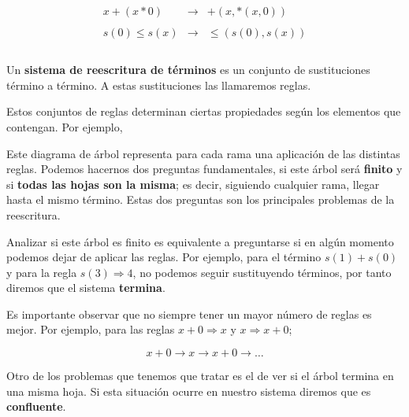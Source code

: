 \[
  \begin{array}{rcl}
    x +(x*0) & \longrightarrow  & +(x,*(x,0)) \\ \\
    s(0) \leq s(x) & \longrightarrow & \leq(s(0),s(x)) \\ \\

  \end{array} 
\]

Un \textbf{sistema de reescritura de términos} es un conjunto de sustituciones
término a término. A estas sustituciones las llamaremos reglas.

Estos conjuntos de reglas determinan ciertas propiedades según los
elementos que contengan. Por ejemplo,

\begin{figure}[h]
  \centering
\end{figure}

Este diagrama de árbol representa para cada rama una aplicación de las
distintas reglas. Podemos hacernos dos preguntas fundamentales, si
este árbol será \textbf{finito} y si \textbf{todas las hojas son la misma}; es decir,
siguiendo cualquier rama, llegar hasta el mismo término. Estas dos
preguntas son los principales problemas de la reescritura.

Analizar si este árbol es finito es equivalente a preguntarse si en
algún momento podemos dejar de aplicar las reglas. Por ejemplo, para
el término $s(1) + s(0)$ y para la regla $s(3) \Rightarrow 4$, no
podemos seguir sustituyendo términos, por tanto diremos que el sistema
\textbf{termina}.

Es importante observar que no siempre tener un mayor número de reglas
es mejor. Por ejemplo, para las reglas $ x + 0 \Rightarrow x$ y
$x \Rightarrow x + 0$;

\[
  x + 0 \longrightarrow x \longrightarrow x+0 \longrightarrow \dots
\]

Otro de los problemas que tenemos que tratar es el de ver si el árbol
termina en una misma hoja. Si esta situación ocurre en nuestro sistema
diremos que es \textbf{confluente}.

